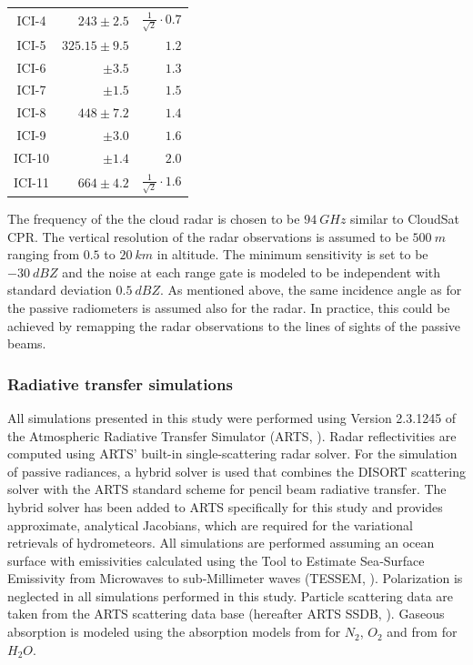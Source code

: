 \documentclass[journal abbreviation, manuscript]{copernicus}
\begin{document}
\begin{table}[hbpt]
\begin{tabular}{c|r|r}
    ICI-4  & $243    \pm 2.5$ & $\frac{1}{\sqrt{2}} \cdot 0.7$\\
    ICI-5  & $325.15 \pm 9.5$ & $1.2$\\
    ICI-6  & $       \pm 3.5$ & $1.3$\\
    ICI-7  & $       \pm 1.5$ & $1.5$\\
    ICI-8  & $448    \pm 7.2$ & $1.4$\\
    ICI-9  & $       \pm 3.0$ & $1.6$\\
    ICI-10 & $       \pm 1.4$ & $2.0$\\
    ICI-11 & $664    \pm 4.2$ & $\frac{1}{\sqrt{2}} \cdot 1.6$\\
    \end{tabular}
\end{table}

The frequency of the the cloud radar is chosen to be $94\ \unit{GHz}$ similar to
CloudSat CPR. The vertical resolution of the radar observations is assumed to be
$500\ \unit{m}$ ranging from $0.5$ to $20\ \unit{km}$ in altitude. The minimum
sensitivity is set to be $-30\ \unit{dBZ}$ and the noise at each range gate is
modeled to be independent with standard deviation $0.5\ \unit{dBZ}$. As mentioned
above, the same incidence angle as for the passive radiometers is assumed also
for the radar. In practice, this could be achieved by remapping the radar
observations to the lines of sights of the passive beams.

\subsubsection{Radiative transfer simulations}
\label{sec:orge741b86}

All simulations presented in this study were performed using Version 2.3.1245 of
the Atmospheric Radiative Transfer Simulator (ARTS, \cite{arts18}). Radar
reflectivities are computed using ARTS' built-in single-scattering radar solver.
For the simulation of passive radiances, a hybrid solver is used that combines
the DISORT \citep{disort00} scattering solver with the ARTS standard scheme for
pencil beam radiative transfer. The hybrid solver has been added to ARTS
specifically for this study and provides approximate, analytical Jacobians,
which are required for the variational retrievals of hydrometeors. All
simulations are performed assuming an ocean surface with emissivities calculated
using the Tool to Estimate Sea‐Surface Emissivity from Microwaves to
sub‐Millimeter waves (TESSEM, \cite{prigent16}). Polarization is neglected in
all simulations performed in this study. Particle scattering data are taken from
the ARTS scattering data base (hereafter ARTS SSDB, \citet{eriksson18}). Gaseous
absorption is modeled using the absorption models from \cite{rosenkranz93}
for $N_2$, $O_2$ and from \cite{rosenkranz98}  for $H_2O$.
\end{document}

